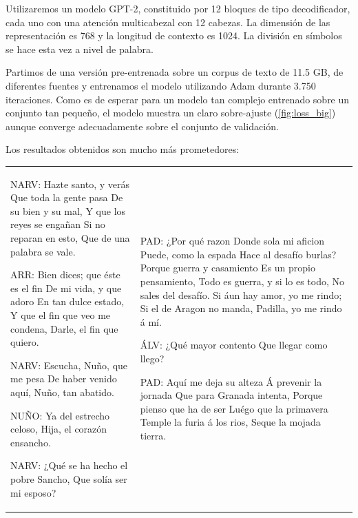 Utilizaremos un modelo GPT-2, constituido por 12 bloques de tipo decodificador, cada uno con una atención multicabezal con 12 cabezas. La dimensión de las representación es 768 y la longitud de contexto es 1024. La división en símbolos se hace esta vez a nivel de palabra.


Partimos de una versión pre-entrenada sobre un corpus de texto de 11.5 GB, de diferentes fuentes\cite{gpt2trained} y entrenamos el modelo utilizando Adam durante 3.750 iteraciones. Como es de esperar para un modelo tan complejo entrenado sobre un conjunto tan pequeño, el modelo muestra un claro sobre-ajuste (\cref{fig:loss_big}) aunque converge adecuadamente sobre el conjunto de validación. 

Los resultados obtenidos son mucho más prometedores:

\noindent
\begin{table}[H]
  \centering
  \begin{tabular}{ ll }
  \begin{Code}
    NARV:
    Hazte santo, y verás
    Que toda la gente pasa
    De su bien y su mal,
    Y que los reyes se engañan
    Si no reparan en esto,
    Que de una palabra se vale.
    
    ARR:
    Bien dices; que éste es el fin
    De mi vida, y que adoro
    En tan dulce estado,
    Y que el fin que veo me condena,
    Darle, el fin que quiero.    

    NARV:
    Escucha, Nuño, que me pesa
    De haber venido aquí,
    Nuño, tan abatido.

    NUÑO:
    Ya del estrecho celoso,
    Hija, el corazón ensancho.

    NARV:
    ¿Qué se ha hecho el pobre Sancho,
    Que solía ser mi esposo?
  \end{Code} 
  &
  \begin{Code}
    PAD:
    ¿Por qué razon
    Donde sola mi aficion
    Puede, como la espada
    Hace al desafío burlas?
    Porque guerra y casamiento
    Es un propio pensamiento,
    Todo es guerra, y si lo es todo,
    No sales del desafío.
    Si áun hay amor, yo me rindo;
    Si el de Aragon no manda,
    Padilla, yo me rindo á mí.
    
    ÁLV:
    ¿Qué mayor contento
    Que llegar como llego?
    
    PAD:
    Aquí me deja su alteza
    Á prevenir la jornada
    Que para Granada intenta,
    Porque pienso que ha de ser
    Luégo que la primavera
    Temple la furia á los rios,
    Seque la mojada tierra.  
  \end{Code}
\end{tabular}
\end{table}

